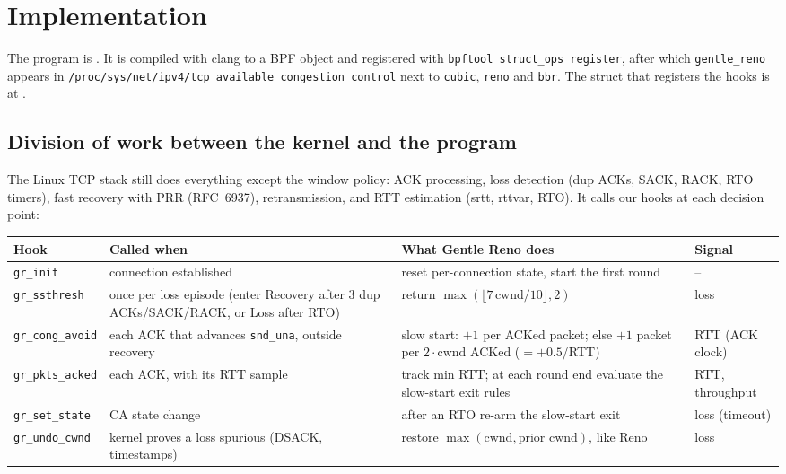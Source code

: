 \documentclass[11pt]{article}
\newcommand{\alg}[1]{\texttt{#1}}
\newcommand{\GR}{Gentle Reno}
\begin{document}
\section{Implementation}
\label{sec:impl}

The program is . It is compiled with clang to a BPF object and
registered with \texttt{bpftool struct\_ops register}, after which \alg{gentle\_reno} appears in
\texttt{/proc/sys/net/ipv4/tcp\_available\_congestion\_control} next to \alg{cubic}, \alg{reno}
and \alg{bbr}. The struct that registers the hooks is at \grOps.

\subsection{Division of work between the kernel and the program}
The Linux TCP stack still does everything except the window policy: ACK processing, loss
detection (dup ACKs, SACK, RACK, RTO timers), fast recovery with PRR (RFC~6937),
retransmission, and RTT estimation (srtt, rttvar, RTO). It calls our hooks at each decision point:

\begin{center}\small
\begin{tabular}{>{\raggedright\arraybackslash}p{2.6cm}>{\raggedright\arraybackslash}p{4.0cm}>{\raggedright\arraybackslash}p{5.3cm}l}
\toprule
Hook & Called when & What \GR{} does & Signal \\
\midrule
\texttt{gr\_init} & connection established & reset per-connection state, start the first round & -- \\
\texttt{gr\_ssthresh} & once per loss episode (enter Recovery after 3 dup ACKs/SACK/RACK, or Loss after RTO) & return $\max(\lfloor 7\,\text{cwnd}/10\rfloor, 2)$ & loss \\
\texttt{gr\_cong\_avoid} & each ACK that advances \texttt{snd\_una}, outside recovery & slow start: $+1$ per ACKed packet; else $+1$ packet per $2\cdot\text{cwnd}$ ACKed ($=+0.5$/RTT) & RTT (ACK clock) \\
\texttt{gr\_pkts\_acked} & each ACK, with its RTT sample & track min RTT; at each round end evaluate the slow-start exit rules & RTT, throughput \\
\texttt{gr\_set\_state} & CA state change & after an RTO re-arm the slow-start exit & loss (timeout) \\
\texttt{gr\_undo\_cwnd} & kernel proves a loss spurious (DSACK, timestamps) & restore $\max(\text{cwnd}, \text{prior\_cwnd})$, like Reno & loss \\
\bottomrule
\end{tabular}
\end{center}
\end{document}
